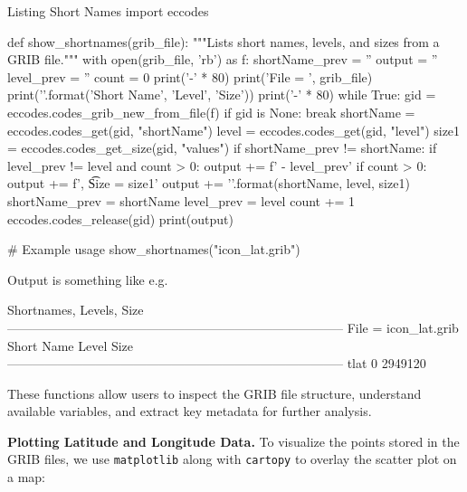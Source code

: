 \begin{codeonly}{Listing Short Names}
import eccodes

def show_shortnames(grib_file):
    """Lists short names, levels, and sizes from a GRIB file."""
    with open(grib_file, 'rb') as f:
        shortName_prev = ''
        output = ''
        level_prev = ''
        count = 0
        print('-' * 80)
        print('File = ', grib_file)
        print(''.format('Short Name', 'Level', 'Size'))
        print('-' * 80)
        while True:
            gid = eccodes.codes_grib_new_from_file(f)
            if gid is None:
                break
            shortName = eccodes.codes_get(gid, "shortName")
            level = eccodes.codes_get(gid, "level")
            size1 = eccodes.codes_get_size(gid, "values")
            if shortName_prev != shortName:
                if level_prev != level and count > 0:
                    output += f' - {level_prev}'
                if count > 0:
                    output += f', \t Size = {size1}'
                output += ''.format(shortName, level, size1)
                shortName_prev = shortName
                level_prev = level
                count += 1
            eccodes.codes_release(gid)
        print(output)

# Example usage
show_shortnames("icon_lat.grib")
\end{codeonly}

Output is something like e.g.\

\begin{codeonly}{Shortnames, Levels, Size}
--------------------------------------------------------------------------------
File =  icon_lat.grib
Short Name                    Level                 Size
--------------------------------------------------------------------------------
tlat                          0                  2949120
\end{codeonly}

These functions allow users to inspect the GRIB file structure, understand available variables, and extract key metadata for further analysis.

{\bf Plotting Latitude and Longitude Data.} To visualize the points stored in the GRIB files, we use \texttt{matplotlib} along with \texttt{cartopy} to overlay the scatter plot on a map:

